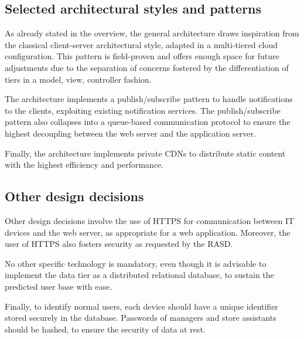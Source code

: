 \documentclass[../../main.tex]{subfiles}
\begin{document}
\subsection{Selected architectural styles and patterns}
    As already stated in the overview, the general architecture draws inspiration from the classical client-server architectural style, adapted in a multi-tiered cloud configuration.  
    This pattern is field-proven and offers enough space for future adjustments due to the separation of concerns fostered by the differentiation of tiers in a model, view, controller fashion.

    The architecture implements a publish/subscribe pattern to handle notifications to the clients, exploiting existing notification services. 
    The publish/subscribe pattern also collapses into a queue-based communication protocol to ensure the highest decoupling between the web server and the application server.

    Finally, the architecture implements private CDNs to distribute static content with the highest efficiency and performance.

\subsection{Other design decisions}

Other design decisions involve the use of HTTPS for communication between IT devices and the web server, as appropriate for a web application. Moreover, 
the user of HTTPS also fosters security as requested by the RASD.

No other specific technology is mandatory, even though it is advisable to implement the data tier as a distributed relational database, to sustain the predicted user base with ease.

Finally, to identify normal users, each device should have a unique identifier stored securely in the database. 
Passwords of managers and store assistants should be hashed, to ensure the security of data at rest.
\end{document}
